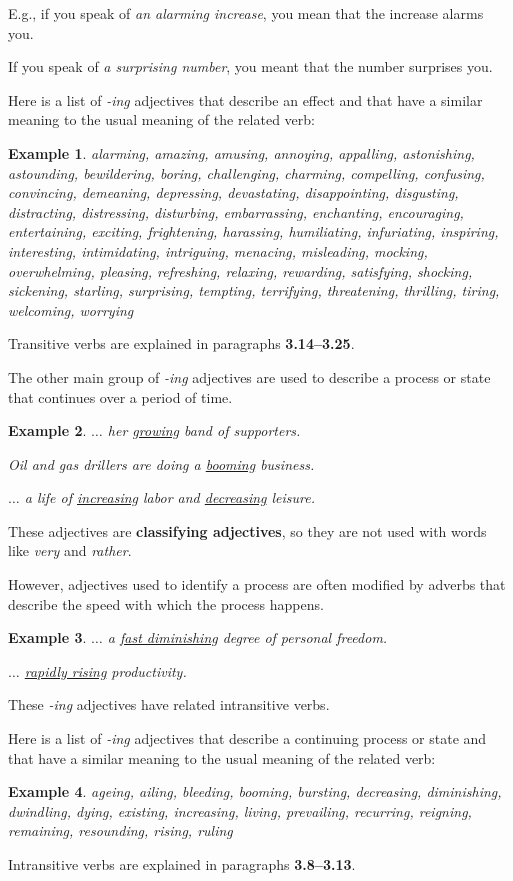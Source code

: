 \documentclass[oneside]{book}
\numberwithin{equation}{section}
\newtheorem{example}{Example}[section]
\begin{document}
E.g., if you speak of \textit{an alarming increase}, you mean that the increase alarms you.

If you speak of \textit{a surprising number}, you meant that the number surprises you.

%
Here is a list of \textit{-ing} adjectives that describe an effect and that have a similar meaning to the usual meaning of the related verb:
\begin{example}
    alarming, amazing, amusing, annoying, appalling, astonishing, astounding, bewildering, boring, challenging, charming, compelling, confusing, convincing, demeaning, depressing, devastating, disappointing, disgusting, distracting, distressing, disturbing, embarrassing, enchanting, encouraging, entertaining, exciting, frightening, harassing, humiliating, infuriating, inspiring, interesting, intimidating, intriguing, menacing, misleading, mocking, overwhelming, pleasing, refreshing, relaxing, rewarding, satisfying, shocking, sickening, starling, surprising, tempting, terrifying, threatening, thrilling, tiring, welcoming, worrying
\end{example}
Transitive verbs are explained in paragraphs \textbf{3.14--3.25}.

%
\noindent{} The other main group of \textit{-ing} adjectives are used to describe a process or state that continues over a period of time.
\begin{example}
    $\ldots$ her \underline{growing} band of supporters.
    
    Oil and gas drillers are doing a \underline{booming} business.
    
    $\ldots$ a life of \underline{increasing} labor and \underline{decreasing} leisure.
\end{example}
%
\noindent{} These adjectives are \textbf{classifying adjectives}, so they are not used with words like \textit{very} and \textit{rather}.

However, adjectives used to identify a process are often modified by adverbs that describe the speed with which the process happens.
\begin{example}
    $\ldots$ a \underline{fast diminishing} degree of personal freedom.
    
    $\ldots$ \underline{rapidly rising} productivity.
\end{example}
%
\noindent{} These \textit{-ing} adjectives have related intransitive verbs.

%
Here is a list of \textit{-ing} adjectives that describe a continuing process or state and that have a similar meaning to the usual meaning of the related verb:
\begin{example}
    ageing, ailing, bleeding, booming, bursting, decreasing, diminishing, dwindling, dying, existing, increasing, living, prevailing, recurring, reigning, remaining, resounding, rising, ruling
\end{example}
Intransitive verbs are explained in paragraphs \textbf{3.8--3.13}.
\end{document}
